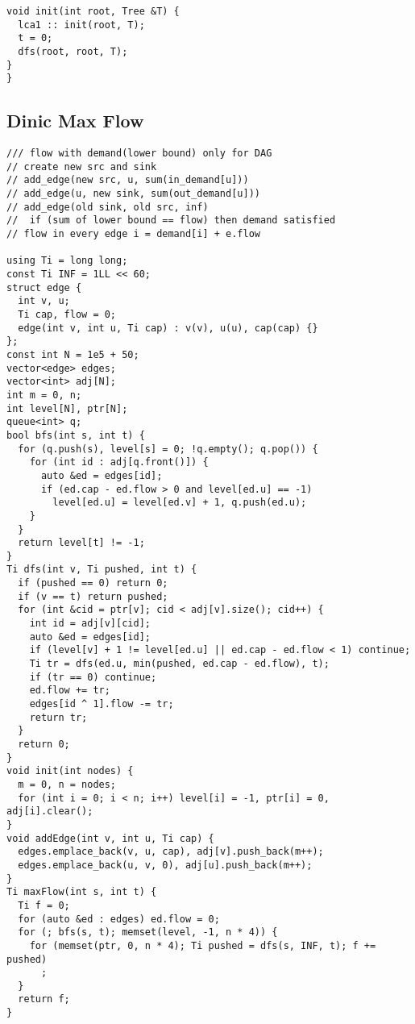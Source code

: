 \documentclass[FSZ,a4paper,onesided]{article}
\begin{document}
\begin{multicols*}{\COLS}
\begin{lstlisting}
void init(int root, Tree &T) {
  lca1 :: init(root, T);
  t = 0;
  dfs(root, root, T);
}
}\end{lstlisting}
\subsection{Dinic Max Flow}
\begin{lstlisting}
/// flow with demand(lower bound) only for DAG
// create new src and sink
// add_edge(new src, u, sum(in_demand[u]))
// add_edge(u, new sink, sum(out_demand[u]))
// add_edge(old sink, old src, inf)
//  if (sum of lower bound == flow) then demand satisfied
// flow in every edge i = demand[i] + e.flow

using Ti = long long;
const Ti INF = 1LL << 60;
struct edge {
  int v, u;
  Ti cap, flow = 0;
  edge(int v, int u, Ti cap) : v(v), u(u), cap(cap) {}
};
const int N = 1e5 + 50;
vector<edge> edges;
vector<int> adj[N];
int m = 0, n;
int level[N], ptr[N];
queue<int> q;
bool bfs(int s, int t) {
  for (q.push(s), level[s] = 0; !q.empty(); q.pop()) {
    for (int id : adj[q.front()]) {
      auto &ed = edges[id];
      if (ed.cap - ed.flow > 0 and level[ed.u] == -1)
        level[ed.u] = level[ed.v] + 1, q.push(ed.u);
    }
  }
  return level[t] != -1;
}
Ti dfs(int v, Ti pushed, int t) {
  if (pushed == 0) return 0;
  if (v == t) return pushed;
  for (int &cid = ptr[v]; cid < adj[v].size(); cid++) {
    int id = adj[v][cid];
    auto &ed = edges[id];
    if (level[v] + 1 != level[ed.u] || ed.cap - ed.flow < 1) continue;
    Ti tr = dfs(ed.u, min(pushed, ed.cap - ed.flow), t);
    if (tr == 0) continue;
    ed.flow += tr;
    edges[id ^ 1].flow -= tr;
    return tr;
  }
  return 0;
}
void init(int nodes) {
  m = 0, n = nodes;
  for (int i = 0; i < n; i++) level[i] = -1, ptr[i] = 0, adj[i].clear();
}
void addEdge(int v, int u, Ti cap) {
  edges.emplace_back(v, u, cap), adj[v].push_back(m++);
  edges.emplace_back(u, v, 0), adj[u].push_back(m++);
}
Ti maxFlow(int s, int t) {
  Ti f = 0;
  for (auto &ed : edges) ed.flow = 0;
  for (; bfs(s, t); memset(level, -1, n * 4)) {
    for (memset(ptr, 0, n * 4); Ti pushed = dfs(s, INF, t); f += pushed)
      ;
  }
  return f;
}
\end{lstlisting}

\end{multicols*}
\end{document}
